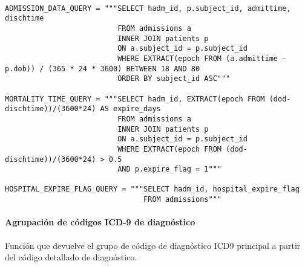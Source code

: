 \documentclass{report}
\begin{document}
\begin{verbatim}
                                
ADMISSION_DATA_QUERY = """SELECT hadm_id, p.subject_id, admittime, dischtime
                          FROM admissions a 
                          INNER JOIN patients p
                          ON a.subject_id = p.subject_id
                          WHERE EXTRACT(epoch FROM (a.admittime - p.dob)) / (365 * 24 * 3600) BETWEEN 18 AND 80
                          ORDER BY subject_id ASC"""
                            
MORTALITY_TIME_QUERY = """SELECT hadm_id, EXTRACT(epoch FROM (dod-dischtime))/(3600*24) AS expire_days 
                          FROM admissions a
                          INNER JOIN patients p
                          ON a.subject_id = p.subject_id
                          WHERE EXTRACT(epoch FROM (dod-dischtime))/(3600*24) > 0.5
                          AND p.expire_flag = 1"""

HOSPITAL_EXPIRE_FLAG_QUERY = """SELECT hadm_id, hospital_expire_flag 
                                FROM admissions"""
\end{verbatim}

\paragraph{Agrupación de códigos ICD-9 de diagnóstico} Función que devuelve el grupo de código de diagnóstico ICD9 principal a partir del código detallado de diagnóstico. 
\end{document}
